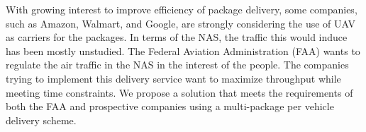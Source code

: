 With growing interest to improve efficiency of package delivery, some companies, such as Amazon, Walmart, and Google, are strongly considering the use of UAV as carriers for the packages. In terms of the NAS, the traffic this would induce has been mostly unstudied. The Federal Aviation Administration (FAA) wants to regulate the air traffic in the NAS in the interest of the people. The companies trying to implement this delivery service want to maximize throughput while meeting time constraints. We propose a solution that meets the requirements of both the FAA and prospective companies using a multi-package per vehicle delivery scheme.

